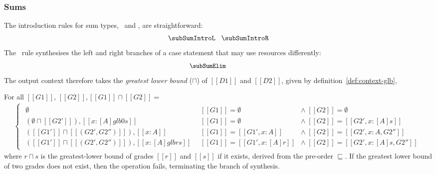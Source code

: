\subsubsection{Sums}
The introduction rules for sum types, \subSumIntroLname\ and \subSumIntroRname, are straightforward:
\begin{align*}
  \subSumIntroL
\;\;\;
  \subSumIntroR
\end{align*}
The \subSumElimName\ rule synthesises the left and
right branches of a case statement that may use resources
differently:
\begin{align*}
\begin{array}{c}
\hspace{-3em}{\small{\subSumElim}}
\end{array}
\end{align*}
The output context therefore takes the \textit{greatest
lower bound} ($\sqcap$) of $[[ D1 ]]$ and $[[ D2 ]]$, given by definition~\ref{def:context-glb},
\begin{definition}\label{def:context-glb}
For all $[[ G1 ]]$, $[[ G2 ]], [[G1]] \sqcap [[G2]] =$
\begin{align*}
\left\{\begin{matrix}
\begin{array}{lll}
\emptyset
  & [[ G1 ]] = \emptyset & \wedge \; [[ G2 ]] = \emptyset
\\
%
(\emptyset \sqcap [[ G2' ]]), [[ x : [ A ] {glb 0 s} ]]
  & [[ G1 ]] = \emptyset & \wedge \; [[G2]] = [[ G2',x : [A] s]]
\\
%
([[G1']] \sqcap [[(G2',G2'')]]), [[x : A]]
 & [[G1]] = [[{G1', x : A} ]] & \wedge \; [[ G2 ]] = [[ {G2', x : A}, G2'' ]]
\\
%
([[G1']] \sqcap [[(G2',G2'')]]), [[x : [A] {glb r s}]]\;\;
 & [[G1]] = [[ G1',x : [A] r]] & \wedge \; [[ G2 ]] = [[{G2', x : [A] s}, G2'']]
\end{array}
\end{matrix}\right.
\end{align*}
where $r\!\sqcap\!s$ is the greatest-lower bound of grades $[[r]]$
and $[[s]]$ if it exists, derived from the pre-order $\sqsubseteq$. If 
the greatest lower bound of two grades does not exist, then the operation fails, 
terminating the branch of synthesis. 
\end{definition}
%
%

